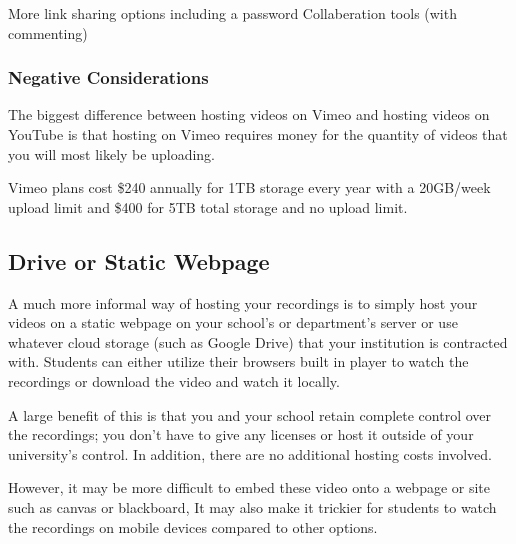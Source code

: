 \documentclass[sigconf]{acmart}
\begin{document}
More link sharing options including a password 
Collaberation tools (with commenting)

\subsubsection{Negative Considerations}
The biggest difference between hosting videos on Vimeo and hosting videos on YouTube is that hosting on Vimeo requires money for the quantity of videos that you will most likely be uploading.

Vimeo plans cost \$240 annually for 1TB storage every year with a 20GB/week upload limit and \$400 for 5TB total storage and no upload limit.



\subsection{Drive or Static Webpage}
A much more informal way of hosting your recordings is to simply host your videos on a static webpage on your school's or department's server or use whatever cloud storage (such as Google Drive) that your institution is contracted with.
Students can either utilize their browsers built in player to watch the recordings or download the video and watch it locally.

A large benefit of this is that you and your school retain complete control over the recordings; you don't have to give any licenses or host it outside of your university's control.
In addition, there are no additional hosting costs involved.

However, it may be more difficult to embed these video onto a webpage or site such as canvas or blackboard, 
It may also make it trickier for students to watch the recordings on mobile devices compared to other options.


%
%
%
\end{document}
